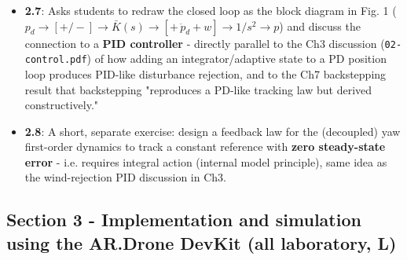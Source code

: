\documentclass[11pt]{article}
\begin{document}
\begin{itemize}
\item \textbf{2.7}: Asks students to redraw the closed loop as the block diagram in Fig. 1 ($p_d \to [+/-] \to \bar K(s) \to [+\, \ddot p_d+w] \to 1/s^2 \to p$) and discuss the connection to a \textbf{PID controller} - directly parallel to the Ch3 discussion (\texttt{02-\allowbreak{}control.pdf}) of how adding an integrator/adaptive state to a PD position loop produces PID-like disturbance rejection, and to the Ch7 backstepping result that backstepping "reproduces a PD-like tracking law but derived constructively."
\item \textbf{2.8}: A short, separate exercise: design a feedback law for the (decoupled) yaw first-order dynamics to track a constant reference with \textbf{zero steady-state error} - i.e. requires integral action (internal model principle), same idea as the wind-rejection PID discussion in Ch3.
\end{itemize}

\subsection{Section 3 - Implementation and simulation using the AR.Drone DevKit (all laboratory, L)}
\end{document}
